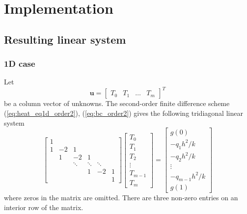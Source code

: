 \documentclass{article}
\begin{document}
\section{Implementation}

\subsection{Resulting linear system}
\subsubsection{1D case}
Let $$\bm{u} = \begin{bmatrix} T_0 & T_1 & \dots & T_m \end{bmatrix}^T$$ be a column vector of unknowns.
The second-order finite difference scheme (\ref{eq:heat_eq1d_order2}), (\ref{eq:bc_order2}) gives the 
following tridiagonal linear system
\begin{equation*}
    \begin{bmatrix} 
    1 \\
    1 & -2 &  1 \\
      &  1 & -2     &  1   \\
      &    & \ddots & \ddots & \ddots \\
      &    &        & 1      & -2     &  1 \\
      &    &        &        &        &  1
    \end{bmatrix}
    \begin{bmatrix}
    T_0 \\ T_1 \\ T_2 \\ \vdots \\ T_{m-1} \\ T_m
    \end{bmatrix}
    =
    \begin{bmatrix}
    g(0) \\ -q_1 h^2/k \\ -q_2 h^2/k \\ \vdots \\ -q_{m-1} h^2/k \\ g(1)
    \end{bmatrix}
\end{equation*}
where zeros in the matrix are omitted. There are three non-zero entries on an interior row of the matrix.
\end{document}
